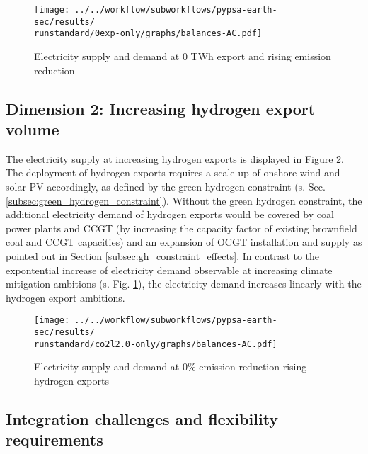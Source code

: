 \begin{figure}[h!]
    \centering
    \texttt{[image: ../../workflow/subworkflows/pypsa-earth-sec/results/\\runstandard/0exp-only/graphs/balances-AC.pdf]}
    \caption{Electricity supply and demand at 0 TWh export and rising emission reduction}
    \label{fig:balances-ac-0exp}
\end{figure}

\subsection{Dimension 2: Increasing hydrogen export volume}
\label{subsec:increase_h2}

The electricity supply at increasing hydrogen exports is displayed in Figure \ref{fig:balances-ac-co2l20}. The deployment of hydrogen exports requires a scale up of onshore wind and solar PV accordingly, as defined by the green hydrogen constraint (s. Sec. \ref{subsec:green_hydrogen_constraint}).
Without the green hydrogen constraint, the additional electricity demand of hydrogen exports would be covered by coal power plants and CCGT (by increasing the capacity factor of existing brownfield coal and CCGT capacities) and an expansion of OCGT installation and supply as pointed out in Section \ref{subsec:gh_constraint_effects}.
In contrast to the expontential increase of electricity demand observable at increasing climate mitigation ambitions (s. Fig. \ref{fig:balances-ac-0exp}), the electricity demand increases linearly with the hydrogen export ambitions.



\begin{figure}[h!]
    \centering
    \texttt{[image: ../../workflow/subworkflows/pypsa-earth-sec/results/\\runstandard/co2l2.0-only/graphs/balances-AC.pdf]}
    \caption{Electricity supply and demand at 0\% emission reduction rising hydrogen exports}
    \label{fig:balances-ac-co2l20}
\end{figure}


\subsection{Integration challenges and flexibility requirements}
\label{subsec:integration_challenges}

